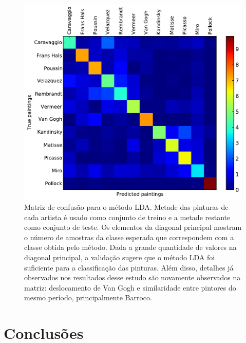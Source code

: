\begin{figure}[h!]
\begin{center}
        \includegraphics[width=\columnwidth]{figs/matriz_confusao}
      \caption{Matriz de confusão para o método LDA. Metade das pinturas de cada
        artista é usado como conjunto de treino e a metade restante como
        conjunto de teste. Os elementos da diagonal principal mostram o número
        de amostras da classe esperada que correspondem com a classe obtida pelo
        método. Dada a grande quantidade de valores na diagonal principal, a
        validação sugere que o método LDA foi suficiente para a classificação
        das pinturas. Além disso, detalhes já observados nos resultados desse
        estudo são novamente observados na matriz: deslocamento de Van Gogh e
        similaridade entre pintores do mesmo período, principalmente Barroco.}
        \label{fig:cm}
\end{center}
\end{figure}



\chapter{Conclusões}
\label{chap:conclusoes}

